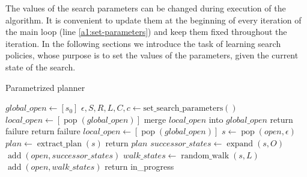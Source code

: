 \documentclass[letterpaper]{article} %
\begin{document}
The values of the search parameters can be changed during execution of the algorithm. It is convenient to update them at the beginning of every iteration of the main loop (line \ref{a1:set-parameters}) and keep them fixed throughout the iteration. In the following sections we introduce the task of learning search policies, whose purpose is to set the values of the parameters, given the current state of the search. 

\begin{algorithm}[ht!]
\caption{Parametrized planner}
\label{alg:pp}
\begin{algorithmic}[1]
{}
\State $global\_open \gets [s_0]$ \label{a1:init}
 \label{a1:main-while}
\State $\epsilon, S, R, L, C, c \gets \operatorname{set\_search\_parameters()}$ \label{a1:set-parameters}
 \label{a1:global-for}
    \State {}
\EndFor \label{a1:end-global-for}
\State $local\_open \gets [\operatorname{pop}(global\_open)]$ \label{a1:seed-local}
 \label{a1:local-for}
    \State {} \label{a1:local-init}
\EndFor \label{a1:end-local-for}
\State merge $local\_open$ into $global\_open$ \label{a1:merge}
\EndWhile \label{a1:end-main-while}
\EndFunction
\State
{} \label{a1:step}
        \State return failure  \label{a1:fail1}
    \Else
            \State return failure  \label{a1:fail2}
        \Else
            \State $local\_open \gets [\operatorname{pop}(global\_open)]$ \label{a1:reseed}
        \EndIf
    \EndIf
\EndIf
\State $s \gets \operatorname{pop}(open, \epsilon)$ \label{a1:expansion}
    \State $plan \gets \operatorname{extract\_plan}(s)$
    \State return $plan$ 
\EndIf
\State $successor\_states \gets \operatorname{expand}(s, O)$
\State $\operatorname{add}(open, successor\_states)$ \label{a1:end-expansion}
 \label{a1:stall} \label{a1:random-walk}
 \label{a1:random-for}
    \State $walk\_states \gets \operatorname{random\_walk}(s, L)$
    \State $\operatorname{add}(open, walk\_states)$
\EndFor \label{a1:end-random-for}
\EndIf \label{a1:end-random-walk}
\State return in\_progress 
\EndFunction \label{a1:end-step}
\end{algorithmic}
\end{algorithm}
\end{document}
